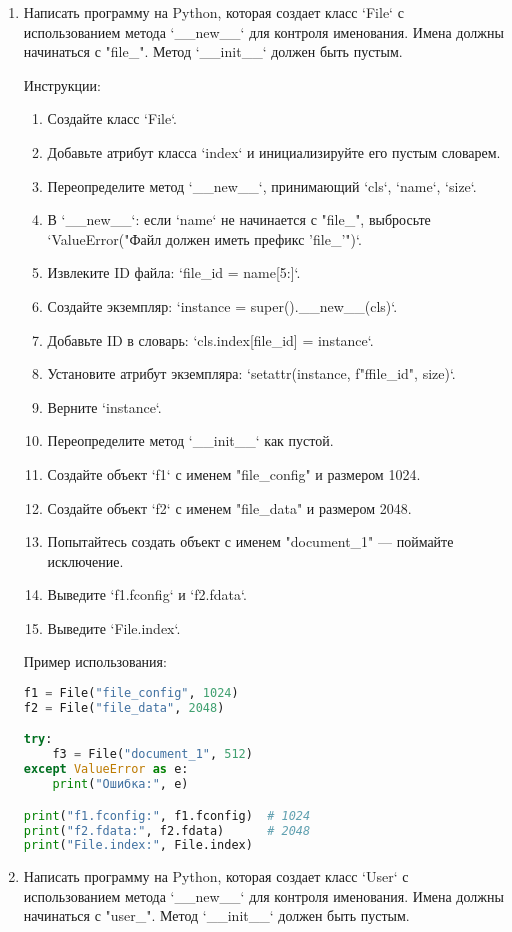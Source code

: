 \begin{enumerate}
\item Написать программу на Python, которая создает класс `File` с использованием метода `\_\_new\_\_` для контроля именования. Имена должны начинаться с "file\_". Метод `\_\_init\_\_` должен быть пустым.

Инструкции:
\begin{enumerate}
    \item Создайте класс `File`.
    \item Добавьте атрибут класса `index` и инициализируйте его пустым словарем.
    \item Переопределите метод `\_\_new\_\_`, принимающий `cls`, `name`, `size`.
    \item В `\_\_new\_\_`: если `name` не начинается с "file\_", выбросьте `ValueError("Файл должен иметь префикс 'file\_'")`.
    \item Извлеките ID файла: `file\_id = name[5:]`.
    \item Создайте экземпляр: `instance = super().\_\_new\_\_(cls)`.
    \item Добавьте ID в словарь: `cls.index[file\_id] = instance`.
    \item Установите атрибут экземпляра: `setattr(instance, f"f{file\_id}", size)`.
    \item Верните `instance`.
    \item Переопределите метод `\_\_init\_\_` как пустой.
    \item Создайте объект `f1` с именем "file\_config" и размером 1024.
    \item Создайте объект `f2` с именем "file\_data" и размером 2048.
    \item Попытайтесь создать объект с именем "document\_1" — поймайте исключение.
    \item Выведите `f1.fconfig` и `f2.fdata`.
    \item Выведите `File.index`.
\end{enumerate}

Пример использования:
\begin{lstlisting}[language=Python]
f1 = File("file_config", 1024)
f2 = File("file_data", 2048)

try:
    f3 = File("document_1", 512)
except ValueError as e:
    print("Ошибка:", e)

print("f1.fconfig:", f1.fconfig)  # 1024
print("f2.fdata:", f2.fdata)      # 2048
print("File.index:", File.index)
\end{lstlisting}

\item Написать программу на Python, которая создает класс `User` с использованием метода `\_\_new\_\_` для контроля именования. Имена должны начинаться с "user\_". Метод `\_\_init\_\_` должен быть пустым.


\end{enumerate}
